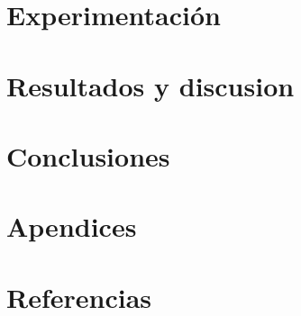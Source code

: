 \documentclass[10pt,a4paper]{article}
\begin{document}
\section{Experimentación}

\newpage

\section{Resultados y discusion}

\newpage


% 

\section{Conclusiones}

\newpage

\section{Apendices}
	
\newpage

\section{Referencias}
	
\newpage
\end{document}
